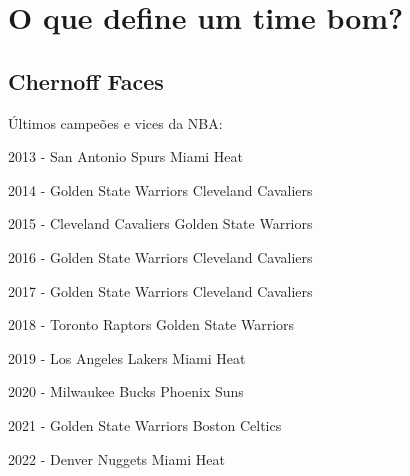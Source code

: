 \documentclass[
]{book}
\begin{document}
\hypertarget{o-que-define-um-time-bom}{%
\chapter{O que define um time bom?}\label{o-que-define-um-time-bom}}

\hypertarget{chernoff-faces}{%
\section{Chernoff Faces}\label{chernoff-faces}}

Últimos campeões e vices da NBA:

2013 - San Antonio Spurs \textbar{} Miami Heat

2014 - Golden State Warriors \textbar{} Cleveland Cavaliers

2015 - Cleveland Cavaliers \textbar{} Golden State Warriors

2016 - Golden State Warriors \textbar{} Cleveland Cavaliers

2017 - Golden State Warriors \textbar{} Cleveland Cavaliers

2018 - Toronto Raptors \textbar{} Golden State Warriors

2019 - Los Angeles Lakers \textbar{} Miami Heat

2020 - Milwaukee Bucks \textbar{} Phoenix Suns

2021 - Golden State Warriors \textbar{} Boston Celtics

2022 - Denver Nuggets \textbar{} Miami Heat
\end{document}
